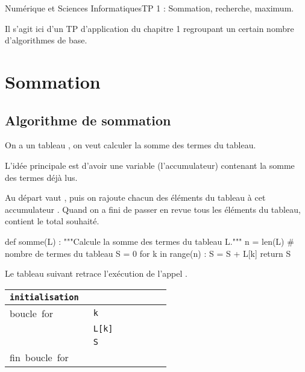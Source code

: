 \documentclass[11pt,a4paper,french,twoside]{PMCours}
\begin{document}
{Numérique et Sciences Informatiques}{TP 1 : Sommation, recherche, maximum.}

Il s'agit ici d'un TP d'application du chapitre 1 regroupant un certain nombre d'algorithmes de base.

\tableofcontents


\newpage

\section{Sommation}
\subsection{Algorithme de sommation}
On a un tableau , on veut calculer la somme des termes du tableau.

L'idée principale est d'avoir une variable  (l'accumulateur) contenant la
somme des termes déjà lus.

Au départ  vaut , puis on rajoute chacun des éléments du tableau à cet
accumulateur . Quand on a fini de passer en revue tous les éléments du
tableau,  contient le total souhaité.

\begin{Python}
def somme(L) :
    """Calcule la somme des termes du tableau L."""
    n = len(L) # nombre de termes du tableau
    S = 0
    for k in range(n) :
        S = S + L[k]
    return S
\end{Python}


Le tableau suivant retrace l'exécution de l'appel .\medskip

{\large \begin{tabular} {|l|p{1cm}|p{1cm}|p{1cm}|p{1cm}|p{1cm}|p{1cm}|}\hline
\verb|initialisation |&\multicolumn{6}{l|}{}\\ \hline
\mbox{boucle for}&\verb|k|& & & && \\ \hline
&\verb|L[k]|& & && & \\ \hline
&\verb|S|& & && & \\ \hline
\mbox{fin boucle for}&\multicolumn{6}{l|}{}\\ \hline
 \end{tabular}}
 
\medskip
\end{document}
